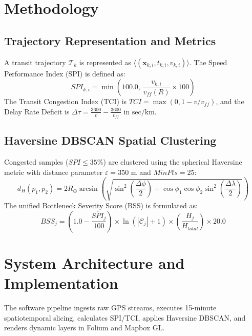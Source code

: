 \documentclass[conference]{IEEEtran}
\begin{document}
\section{Methodology}
\subsection{Trajectory Representation and Metrics}
A transit trajectory $\mathcal{T}_k$ is represented as $\langle (\mathbf{x}_{k,i}, t_{k,i}, v_{k,i}) \rangle$. The Speed Performance Index (SPI) is defined as:
\begin{equation}
SPI_{k,i} = \min\left(100.0, \, \frac{v_{k,i}}{v_{ff}(R)} \times 100\right)
\end{equation}
The Transit Congestion Index (TCI) is $TCI = \max(0, 1 - v/v_{ff})$, and the Delay Rate Deficit is $\Delta \tau = \frac{3600}{v} - \frac{3600}{v_{ff}}$ in $\text{sec/km}$.

\subsection{Haversine DBSCAN Spatial Clustering}
Congested samples ($SPI \le 35\%$) are clustered using the spherical Haversine metric with distance parameter $\varepsilon = 350\text{ m}$ and $MinPts = 25$:
\begin{equation}
d_H(p_1, p_2) = 2 R_{\oplus} \arcsin \left( \sqrt{ \sin^2\left(\frac{\Delta \phi}{2}\right) + \cos \phi_1 \cos \phi_2 \sin^2\left(\frac{\Delta \lambda}{2}\right) } \right)
\end{equation}
The unified Bottleneck Severity Score (BSS) is formulated as:
\begin{equation}
BSS_j = \left(1.0 - \frac{\overline{SPI}_j}{100}\right) \times \ln(|\mathcal{C}_j| + 1) \times \left(\frac{H_j}{H_{total}}\right) \times 20.0
\end{equation}

\section{System Architecture and Implementation}
The software pipeline ingests raw GPS streams, executes 15-minute spatiotemporal slicing, calculates SPI/TCI, applies Haversine DBSCAN, and renders dynamic layers in Folium and Mapbox GL.
\end{document}
